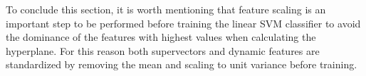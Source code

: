 To conclude this section, it is worth mentioning that feature scaling is an important
step to be performed before training
the linear SVM classifier to avoid the dominance of the
features with highest values
when calculating the hyperplane. For this reason both supervectors
and dynamic features are standardized by removing the mean and scaling to unit variance
before training.
